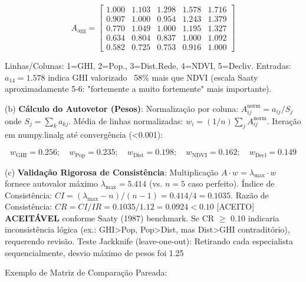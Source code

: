 \documentclass[12pt, a4paper]{article}
\begin{document}
\begin{equation}
A_{\text{agg}} = \begin{bmatrix}
1.000 & 1.103 & 1.298 & 1.578 & 1.716 \\
0.907 & 1.000 & 0.954 & 1.243 & 1.379 \\
0.770 & 1.049 & 1.000 & 1.195 & 1.327 \\
0.634 & 0.804 & 0.837 & 1.000 & 1.092 \\
0.582 & 0.725 & 0.753 & 0.916 & 1.000
\end{bmatrix}
\end{equation}

Linhas/Colunas: 1=GHI, 2=Pop., 3=Dist.Rede, 4=NDVI, 5=Decliv. Entradas: $a_{14}=1.578$ indica GHI valorizado ~58\% mais que NDVI (escala Saaty aproximadamente 5-6: "fortemente a muito fortemente" mais importante).

(b) \textbf{Cálculo do Autovetor (Pesos)}: Normalização por coluna: $A^{\text{norm}}_{ij} = a_{ij}/S_j$ onde $S_j = \sum_k a_{kj}$. Média de linhas normalizadas: $w_i = (1/n) \sum_j A^{\text{norm}}_{ij}$. Iteração em numpy.linalg até convergência (<0.001):

\begin{equation}
w_{\text{GHI}} = 0.256; \quad w_{\text{Pop}} = 0.235; \quad w_{\text{Dist}} = 0.198; \quad w_{\text{NDVI}} = 0.162; \quad w_{\text{Decl}} = 0.149
\end{equation}

(c) 
\textbf{Validação Rigorosa de Consistência}: Multiplicação $A \cdot w = \lambda_{\max} \cdot w$ fornece autovalor máximo $\lambda_{\max} = 5.414$ (vs. $n=5$ caso perfeito). Índice de Consistência: $CI = (\lambda_{\max} - n)/(n-1) = 0.414/4 = 0.1035$. Razão de Consistência: $CR = CI/IR = 0.1035/1.12 = 0.0924 < 0.10$ [ACEITO] 
\textbf{ACEITÁVEL} conforme Saaty (1987) benchmark. Se CR $\geq$ 0.10 indicaria inconsistência lógica (ex.: GHI>Pop, Pop>Dist, mas Dist>GHI contraditório), requerendo revisão. Teste Jackknife (leave-one-out): Retirando cada especialista sequencialmente, desvio máximo de pesos foi 1.25%

Exemplo de Matriz de Comparação Pareada:

\begin{table}[H]
\centering
\caption{Exemplo: Matriz Pareada de Comparação (Saaty 1-9)}
\footnotesize
{}
\end{table}
\end{document}
